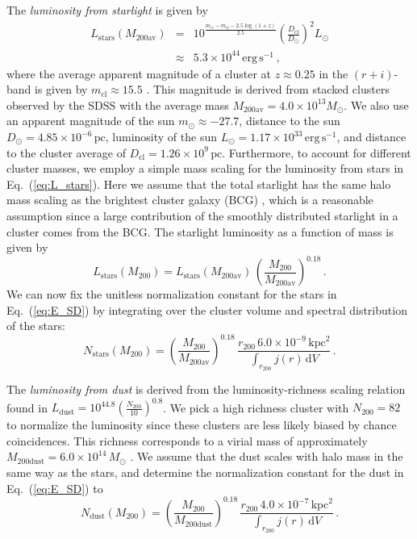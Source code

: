 \documentclass[10pt,aps,pra,reprint,amsmath,amsfonts,amssymb,showpacs,nofootinbib,floatfix]{revtex4-1}
\newcommand{\rmn}{\mathrm}
\newcommand{\clu}{\rmn{cl}}
\newcommand{\msun}{M_\odot}
\newcommand{\stars}{\rmn{stars}}
\newcommand{\dust}{\rmn{dust}}
\newcommand{\kpc}{\rmn{kpc}}
\newcommand{\dd}{\rmn{d}}
\newcommand{\rvir}{r_{200}}
\newcommand{\mvir}{M_{200}}
\begin{document}
The {\em luminosity from starlight} is given by
\begin{eqnarray}
L_\stars(M_{200\rmn{av}})&=&10^{\frac{m_\odot-m_\rmn{cl}-2.5\log\left(1+z\right)}{2.5}}
\left(\frac{D_\clu}{D_\odot}\right)^2 L_\odot\nonumber\\
&\approx& 5.3\times10^{44}\,\rmn{erg}\,\rmn{s}^{-1}\,,
\label{eq:L_stars}
\end{eqnarray}
where the average apparent magnitude of a cluster at $z\approx 0.25$
in the $(r+i)$-band is given by $m_\rmn{cl}\approx 15.5$
\cite{2005MNRAS.358..949Z}. This magnitude is derived from stacked
clusters observed by the SDSS with the average mass
$M_{200\rmn{av}}=4.0\times10^{13}\msun$. We also use an apparent
magnitude of the sun $m_\odot\approx -27.7$, distance to the sun
$D_\odot=4.85\times10^{-6}\,\rmn{pc}$, luminosity of the sun
$L_\odot=1.17\times10^{33}\,\rmn{erg\,s}^{-1}$, and distance to the
cluster average of $D_\clu=1.26\times10^9\,\rmn{pc}$. Furthermore, to account for
different cluster masses, we employ a simple mass scaling for the
luminosity from stars in Eq.~(\ref{eq:L_stars}). Here we assume
that the total starlight has the same halo mass scaling as the
brightest cluster galaxy (BCG) \cite{2010ApJ...713.1037H}, which is a
reasonable assumption since a large contribution of the smoothly distributed
starlight in a cluster comes from the BCG. The starlight luminosity as
a function of mass is given by
\begin{equation}
L_\stars(\mvir)=L_\stars(M_{200\rmn{av}})\,
\left(\frac{\mvir}{M_{200\rmn{av}}}\right)^{0.18}\,.
\label{eq:L_stars_m}
\end{equation}
We can now fix the unitless normalization constant for the stars in
Eq.~(\ref{eq:E_SD}) by integrating over the cluster volume and
spectral distribution of the stars:
\begin{equation}
 N_\stars(\mvir) =
\left(\frac{\mvir}{M_{200\rmn{av}}}\right)^{0.18}\,
\frac{\rvir\, 6.0\times10^{-9}\,\kpc^2}{\int_{\rvir} j(r) \,\dd V}\,.
\label{eq:N_stars}
\end{equation}

The {\em luminosity from dust} is derived from the
luminosity-richness scaling relation found in
\cite{2008A&A...490..547G}
$L_\dust=10^{44.8}\left(\frac{N_{200}}{10}\right)^{0.8}$. We pick a
high richness cluster with $N_{200}=82$ to normalize the luminosity
since these clusters are less likely biased by chance
coincidences. This richness corresponds to a virial mass of approximately
$M_\rmn{200dust}=6.0\times10^{14}\,\msun$
\cite{2010ApJ...713.1037H}. We assume that the dust scales with halo
mass in the same way as the stars, and determine the normalization
constant for the dust in Eq.~(\ref{eq:E_SD}) to
\begin{equation}
 N_\dust(\mvir) =
\left(\frac{\mvir}{M_\rmn{200dust}}\right)^{0.18}\,
\frac{\rvir\,4.0\times10^{-7}\,\kpc^2}{\int_{\rvir} j(r) \,\dd V}\,.
\label{eq:N_dust}
\end{equation}
\end{document}
